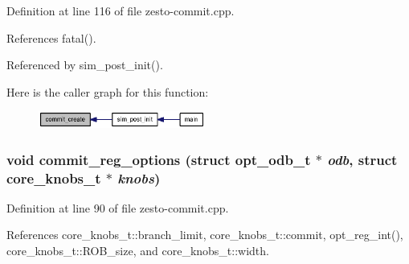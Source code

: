 Definition at line 116 of file zesto-commit.cpp.

References fatal().

Referenced by sim\_\-post\_\-init().

Here is the caller graph for this function:\nopagebreak
\begin{figure}[H]
\begin{center}
\leavevmode
\includegraphics[width=155pt]{zesto-commit_8cpp_6dec1ee8a7d324bb5e49bd7246608c52_icgraph}
\end{center}
\end{figure}
\subsubsection[{commit\_\-reg\_\-options}]{\setlength{\rightskip}{0pt plus 5cm}void commit\_\-reg\_\-options (struct {\bf opt\_\-odb\_\-t} $\ast$ {\em odb}, \/  struct {\bf core\_\-knobs\_\-t} $\ast$ {\em knobs})}\label{zesto-commit_8cpp_bf5d3f1b50f2a0e8740d65296668ced0}




Definition at line 90 of file zesto-commit.cpp.

References core\_\-knobs\_\-t::branch\_\-limit, core\_\-knobs\_\-t::commit, opt\_\-reg\_\-int(), core\_\-knobs\_\-t::ROB\_\-size, and core\_\-knobs\_\-t::width.